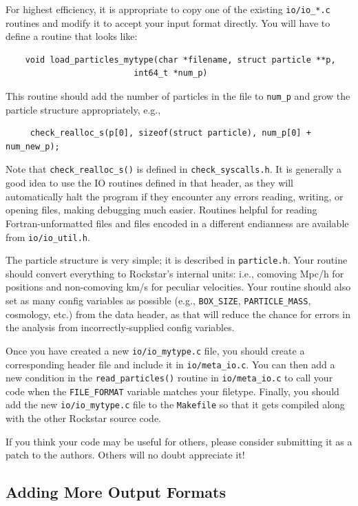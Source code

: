 \documentclass[12pt]{article}
\begin{document}
For highest efficiency, it is appropriate to copy one of the existing \texttt{io/io\_*.c} routines and modify it to accept your input format directly.  You will have to define a routine that looks like:
\begin{verbatim}
    void load_particles_mytype(char *filename, struct particle **p, 
	       				  int64_t *num_p)
\end{verbatim}					  
This routine should add the number of particles in the file to \texttt{num\_p} and grow the particle structure appropriately, e.g.,
\begin{verbatim}
     check_realloc_s(p[0], sizeof(struct particle), num_p[0] + num_new_p);
\end{verbatim}
Note that \texttt{check\_realloc\_s()} is defined in \texttt{check\_syscalls.h}.  It is generally a good idea to use the IO routines defined in that header, as they will automatically halt the program if they encounter any errors reading, writing, or opening files, making debugging much easier.  Routines helpful for reading Fortran-unformatted files and files encoded in a different endianness are available from \texttt{io/io\_util.h}.

The particle structure is very simple; it is described in \texttt{particle.h}.  Your routine should convert everything to Rockstar's internal units: i.e., comoving Mpc/h for positions and non-comoving km/s for peculiar velocities.  Your routine should also set as many config variables as possible (e.g., \texttt{BOX\_SIZE}, \texttt{PARTICLE\_MASS}, cosmology, etc.) from the data header, as that will reduce the chance for errors in the analysis from incorrectly-supplied config variables.

Once you have created a new \texttt{io/io\_mytype.c} file, you should create a corresponding header file and include it in \texttt{io/meta\_io.c}.  You can then add a new condition in the \texttt{read\_particles()} routine in \texttt{io/meta\_io.c} to call your code when the \texttt{FILE\_FORMAT} variable matches your filetype.  Finally, you should add the new \texttt{io/io\_mytype.c} file to the \texttt{Makefile} so that it gets compiled along with the other Rockstar source code.

If you think your code may be useful for others, please consider submitting it as a patch to the authors.  Others will no doubt appreciate it!

\subsection{Adding More Output Formats}
\end{document}
